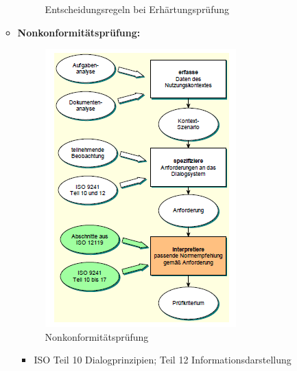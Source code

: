 \begin{enumerate}
\begin{itemize}
\begin{figure}[!h]
			\caption{Entscheidungsregeln bei Erhärtungsprüfung}
		\end{figure}
		\item \textbf{Nonkonformitätsprüfung:}
		\begin{figure}[!h]
			\centering
			\includegraphics[scale=0.5]{img/nonkonformitaet.png}
			\caption{Nonkonformitätsprüfung}
		\end{figure}
		\begin{itemize}
			\item ISO Teil 10 Dialogprinzipien; Teil 12 Informationsdarstellung
		\end{itemize}
	\end{itemize}


\end{enumerate}
